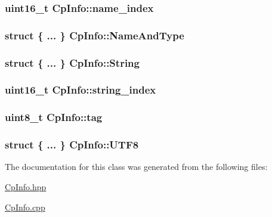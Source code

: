 \subsubsection[{\texorpdfstring{name\+\_\+index}{name_index}}]{\setlength{\rightskip}{0pt plus 5cm}uint16\+\_\+t Cp\+Info\+::name\+\_\+index}\hypertarget{class_cp_info_a8337463c52221eaead88f232ded768a7}{}\label{class_cp_info_a8337463c52221eaead88f232ded768a7}
\subsubsection[{\texorpdfstring{Name\+And\+Type}{NameAndType}}]{\setlength{\rightskip}{0pt plus 5cm}struct \{ ... \}   Cp\+Info\+::\+Name\+And\+Type}\hypertarget{class_cp_info_af8ab428cfd1348391c7d3b26d94d6567}{}\label{class_cp_info_af8ab428cfd1348391c7d3b26d94d6567}
\subsubsection[{\texorpdfstring{String}{String}}]{\setlength{\rightskip}{0pt plus 5cm}struct \{ ... \}   Cp\+Info\+::\+String}\hypertarget{class_cp_info_a9e47b825b6e22ad57a9b78cf430cd6bc}{}\label{class_cp_info_a9e47b825b6e22ad57a9b78cf430cd6bc}
\subsubsection[{\texorpdfstring{string\+\_\+index}{string_index}}]{\setlength{\rightskip}{0pt plus 5cm}uint16\+\_\+t Cp\+Info\+::string\+\_\+index}\hypertarget{class_cp_info_a4b2f7aa4ac461ac4d860d566c5e3323e}{}\label{class_cp_info_a4b2f7aa4ac461ac4d860d566c5e3323e}
\subsubsection[{\texorpdfstring{tag}{tag}}]{\setlength{\rightskip}{0pt plus 5cm}uint8\+\_\+t Cp\+Info\+::tag}\hypertarget{class_cp_info_ac20d96c33f871bde2e903708a215a2dc}{}\label{class_cp_info_ac20d96c33f871bde2e903708a215a2dc}
\subsubsection[{\texorpdfstring{U\+T\+F8}{UTF8}}]{\setlength{\rightskip}{0pt plus 5cm}struct \{ ... \}   Cp\+Info\+::\+U\+T\+F8}\hypertarget{class_cp_info_a1959c604c24ea0a8c2ab8a4f3094f3e0}{}\label{class_cp_info_a1959c604c24ea0a8c2ab8a4f3094f3e0}


The documentation for this class was generated from the following files\+:\begin{DoxyCompactItemize}
\item 
\hyperlink{_cp_info_8hpp}{Cp\+Info.\+hpp}\item 
\hyperlink{_cp_info_8cpp}{Cp\+Info.\+cpp}\end{DoxyCompactItemize}

